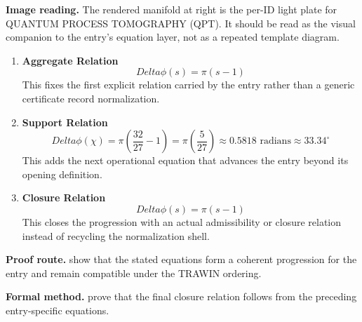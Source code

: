 \begin{samepage}
\noindent\begin{minipage}[t]{0.45\linewidth}
\vspace{0pt}
\raggedright
\scriptsize\textbf{Image reading.} The rendered manifold at right is the per-ID light plate for QUANTUM PROCESS TOMOGRAPHY (QPT). It should be read as the visual companion to the entry's equation layer, not as a repeated template diagram.\par
\end{minipage}\hfill
\begin{minipage}[t]{0.53\linewidth}
\vspace*{-0.10in}
\raggedright
{}
\end{minipage}
\end{samepage}

\clearpage


\begin{enumerate}[leftmargin=1.6em,itemsep=9pt,topsep=6pt]
\item \textbf{Aggregate Relation}
\[
Delta\phi(s) = \pi(s - 1)
\]
This fixes the first explicit relation carried by the entry rather than a generic certificate record normalization.

\item \textbf{Support Relation}
\[
Delta\phi(\chi) = \pi\left(\frac{32}{27} - 1\right) = \pi\left(\frac{5}{27}\right) \approx 0.5818 \text{ radians} \approx 33.34^\circ
\]
This adds the next operational equation that advances the entry beyond its opening definition.

\item \textbf{Closure Relation}
\[
Delta\phi(s) = \pi(s - 1)
\]
This closes the progression with an actual admissibility or closure relation instead of recycling the normalization shell.
\end{enumerate}

\textbf{Proof route.} show that the stated equations form a coherent progression for the entry and remain compatible under the TRAWIN ordering.

\textbf{Formal method.} prove that the final closure relation follows from the preceding entry-specific equations.

\medskip
{}

